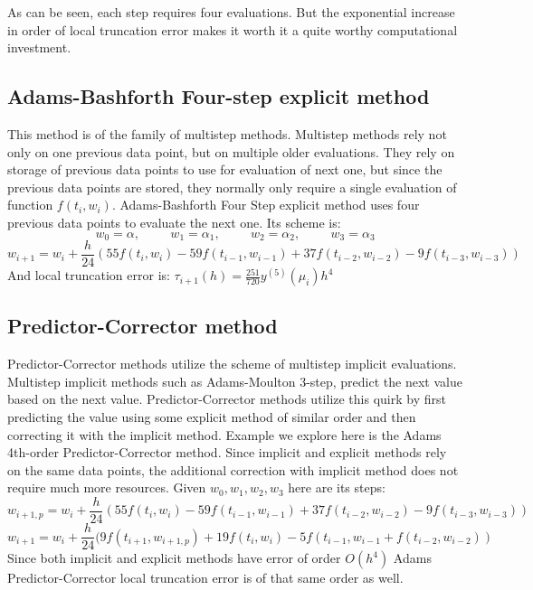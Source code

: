 \documentclass[11pt]{article}	%
\begin{document}
As can be seen, each step requires four evaluations. But the exponential increase in order of 
local truncation error makes it worth it a quite worthy computational investment. 

\subsection{Adams-Bashforth Four-step explicit method}
This method is of the family of multistep methods. Multistep methods rely not only on one previous data point, but on multiple older evaluations. They rely on storage of previous data points to use for evaluation of next one, but since the previous data points are stored, they normally only require a single evaluation of function $f(t_i,w_i)$. Adams-Bashforth Four Step explicit method uses four previous data points to evaluate the next one. Its scheme is:
$$w_0 = \alpha , \hspace{1cm} w_1 = \alpha _1, \hspace{1cm} w_2 = \alpha _2, \hspace{1cm} w_3 = \alpha _3$$
$$w_{i+1} = w_i + \frac{h}{24}(55f(t_i,w_i) - 59f(t_{i-1}, w_{i-1}) + 37f(t_{i-2}, w_{i-2}) - 9f(t_{i-3}, w_{i-3}))$$
And local truncation error is: $\tau _{i+1}(h) = \frac{251}{720}y^{(5)}(\mu _i)h^4$

\subsection{Predictor-Corrector method}
Predictor-Corrector methods utilize the scheme of multistep implicit evaluations. Multistep implicit methods such as Adams-Moulton 3-step, predict the next value based on the next value. 
Predictor-Corrector methods utilize this quirk by first predicting the value using some explicit 
method of similar order and then correcting it with the implicit method. Example we explore here is
the Adams 4th-order Predictor-Corrector method. Since implicit and explicit methods rely on the same data points, the additional correction with implicit method does not require much more
resources. Given $w_0, w_1, w_2, w_3$ here are its steps: 
$$w_{i+1,p} = w_i + \frac{h}{24}(55f(t_i,w_i) - 59f(t_{i-1}, w_{i-1}) + 37f(t_{i-2}, w_{i-2}) - 9f(t_{i-3}, w_{i-3}))$$
$$w_{i+1} = w_i + \frac{h}{24}(9f(t_{i+1}, w_{i+1, p}) + 19f(t_i, w_i) - 5f(t_{i-1}, w_{i-1} + f(t_{i-2}, w_{i-2}))$$
Since both implicit and explicit methods have error of order $O(h^4)$ Adams Predictor-Corrector local truncation error is of that same order as well. 
\end{document}
